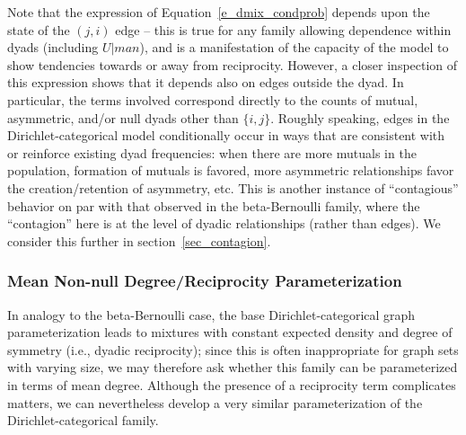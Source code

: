 \documentclass[11pt]{article}
\begin{document}
Note that the expression of Equation~\ref{e_dmix_condprob} depends upon the state of the $(j,i)$ edge -- this is true for any family allowing dependence within dyads (including $U|man$), and is a manifestation of the capacity of the model to show tendencies towards or away from reciprocity.  However, a closer inspection of this expression shows that it depends also on edges outside the dyad.  In particular, the terms involved correspond directly to the counts of mutual, asymmetric, and/or null dyads other than $\{i,j\}$.  Roughly speaking, edges in the Dirichlet-categorical model conditionally occur in ways that are consistent with or reinforce existing dyad frequencies: when there are more mutuals in the population, formation of mutuals is favored, more asymmetric relationships favor the creation/retention of asymmetry, etc.  This is another instance of ``contagious'' behavior on par with that observed in the beta-Bernoulli family, where the ``contagion'' here is at the level of dyadic relationships (rather than edges).  We consider this further in section~\ref{sec_contagion}.

\subsubsection{Mean Non-null Degree/Reciprocity Parameterization} \label{sec_dcat_meandeg}

In analogy to the beta-Bernoulli case, the base Dirichlet-categorical graph parameterization leads to mixtures with constant expected density and degree of symmetry (i.e., dyadic reciprocity); since this is often inappropriate for graph sets with varying size, we may therefore ask whether this family can be parameterized in terms of mean degree.  Although the presence of a reciprocity term complicates matters, we can nevertheless develop a very similar parameterization of the Dirichlet-categorical family.
\end{document}
